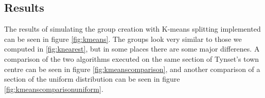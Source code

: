 \subsection{Results}
The results of simulating the group creation with K-means splitting implemented can be seen in figure \ref{fig:kmeans}. The groups look very similar to those we computed in \ref{fig:knearest}, but
in some places there are some major differenes. A comparison of the two algorithms executed on the same section of Tynset's town centre can be seen in figure \ref{fig:kmeanscomparison}, and another
comparison of a section of the uniform distribution can be seen in figure \ref{fig:kmeanscomparisonuniform}. 

\begin{figure}
	\centering
		\qquad
		\newline

\end{figure}
